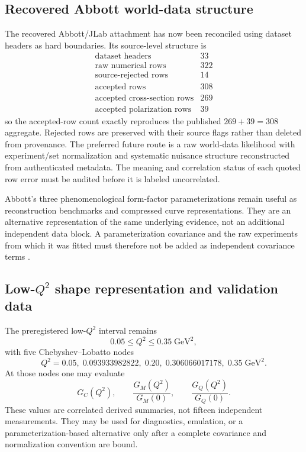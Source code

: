 \documentclass[11pt,oneside]{book}
\newcommand{\GeV}{\mathrm{GeV}}
\begin{document}
\subsection{Recovered Abbott world-data structure}

The recovered Abbott/JLab attachment has now been reconciled using dataset headers as hard boundaries.  Its source-level structure is
\begin{equation}
 \begin{array}{c|r}
 \text{dataset headers}&33\\
 \text{raw numerical rows}&322\\
 \text{source-rejected rows}&14\\
 \text{accepted rows}&308\\
 \text{accepted cross-section rows}&269\\
 \text{accepted polarization rows}&39
 \end{array}
 \label{eq:abbott-row-reconciliation}
\end{equation}
so the accepted-row count exactly reproduces the published $269+39=308$ aggregate.  Rejected rows are preserved with their source flags rather than deleted from provenance.  The preferred future route is a raw world-data likelihood with experiment/set normalization and systematic nuisance structure reconstructed from authenticated metadata.  The meaning and correlation status of each quoted row error must be audited before it is labeled uncorrelated.

Abbott's three phenomenological form-factor parameterizations remain useful as reconstruction benchmarks and compressed curve representations.  They are an alternative representation of the same underlying evidence, not an additional independent data block.  A parameterization covariance and the raw experiments from which it was fitted must therefore not be added as independent covariance terms \cite{AbbottEtAl2000,DWC400AbbottRecovery2026}.

\subsection{\texorpdfstring{Low-$Q^2$}{Low-Q2} shape representation and validation data}

The preregistered low-$Q^2$ interval remains
\begin{equation}
 0.05\le Q^2\le0.35\;\GeV^2,
\end{equation}
with five Chebyshev--Lobatto nodes
\begin{equation}
 Q^2=0.05,\;0.093933982822,\;0.20,\;0.306066017178,\;0.35\;\GeV^2.
 \label{eq:form-factor-nodes}
\end{equation}
At those nodes one may evaluate
\begin{equation}
 G_C(Q^2),\qquad
 \frac{G_M(Q^2)}{G_M(0)},\qquad
 \frac{G_Q(Q^2)}{G_Q(0)}.
 \label{eq:shape-targets}
\end{equation}
These values are correlated derived summaries, not fifteen independent measurements.  They may be used for diagnostics, emulation, or a parameterization-based alternative only after a complete covariance and normalization convention are bound.
\end{document}
